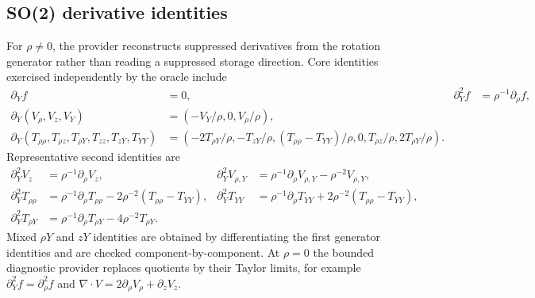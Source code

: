 \subsection{SO(2) derivative identities}
For $\rho\ne0$, the provider reconstructs suppressed derivatives from the
rotation generator rather than reading a suppressed storage direction.  Core
identities exercised independently by the oracle include
\begin{align*}
\partial_Y f&=0,& \partial_Y^2f&=\rho^{-1}\partial_\rho f,\\
\partial_Y(V_\rho,V_z,V_Y)&=(-V_Y/\rho,0,V_\rho/\rho),\\
\partial_Y(T_{\rho\rho},T_{\rho z},T_{\rho Y},T_{zz},T_{zY},T_{YY})
 &=(-2T_{\rho Y}/\rho,-T_{zY}/\rho,
 (T_{\rho\rho}-T_{YY})/\rho,0,T_{\rho z}/\rho,
 2T_{\rho Y}/\rho).
\end{align*}
Representative second identities are
\begin{align*}
\partial_Y^2V_z&=\rho^{-1}\partial_\rho V_z,&
\partial_Y^2V_{\rho,Y}&=\rho^{-1}\partial_\rho V_{\rho,Y}
                         -\rho^{-2}V_{\rho,Y},\\
\partial_Y^2T_{\rho\rho}&=\rho^{-1}\partial_\rho T_{\rho\rho}
-2\rho^{-2}(T_{\rho\rho}-T_{YY}),&
\partial_Y^2T_{YY}&=\rho^{-1}\partial_\rho T_{YY}
+2\rho^{-2}(T_{\rho\rho}-T_{YY}),\\
\partial_Y^2T_{\rho Y}&=\rho^{-1}\partial_\rho T_{\rho Y}
-4\rho^{-2}T_{\rho Y}.
\end{align*}
Mixed $\rho Y$ and $zY$ identities are obtained by differentiating the first
generator identities and are checked component-by-component.  At $\rho=0$ the
bounded diagnostic provider replaces quotients by their Taylor limits, for example
$\partial_Y^2f=\partial_\rho^2f$ and
$\nabla\!\cdot V=2\partial_\rho V_\rho+\partial_zV_z$.


